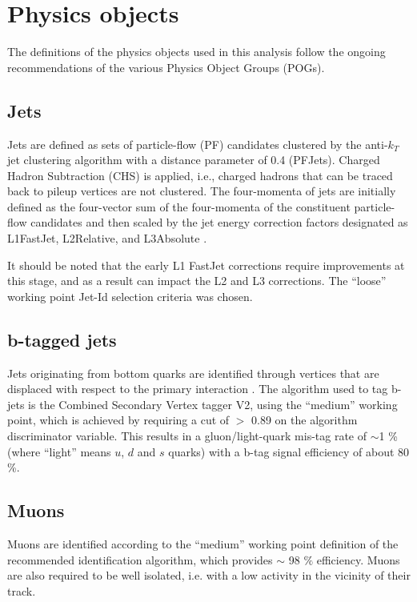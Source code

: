 \section{Physics objects}
\label{sec:objects}
The definitions of the physics objects used in this analysis follow the ongoing recommendations of the various Physics Object Groups (POGs). 

\subsection{Jets}
\label{sec:jetreco}
Jets are defined as sets of particle-flow (PF) candidates clustered by the
anti-$k_{T}$ jet clustering algorithm \cite{Cacciari:2008gp} with a distance parameter of 0.4
(PFJets). Charged Hadron Subtraction (CHS) is applied, i.e., charged
hadrons that can be traced back to pileup vertices are not clustered.
The four-momenta of jets are initially defined as the four-vector sum of
the four-momenta of the constituent particle-flow candidates and then
scaled by the jet energy correction factors designated as L1FastJet,
L2Relative, and L3Absolute \cite{Chatrchyan:2011ds}.

It should be noted that the early L1 FastJet corrections require
improvements at this stage, and as a result can impact the L2 and L3
corrections. The ``loose'' working point Jet-Id selection criteria was
chosen.

\subsection{b-tagged jets}
\label{sec:btags}
Jets originating from bottom quarks are identified through vertices that are displaced with respect to the primary interaction \cite{Chatrchyan:2012jua}. The algorithm used to tag b-jets is the Combined Secondary Vertex tagger V2, using the ``medium'' working point, which is achieved by requiring a cut of $>$ 0.89 on the algorithm discriminator variable. 
This results in a gluon/light-quark mis-tag rate of $\sim$1 \% (where ``light'' means $u$, $d$ and $s$ quarks) with a b-tag signal efficiency of about 80 \%. 


\subsection{Muons}
\label{sec:muon-id}
Muons are identified according to the ``medium'' working point definition of the recommended identification algorithm, which provides $\sim$ 98 $\%$ efficiency. 
Muons are also required to be well isolated, i.e. with a low activity in the vicinity of their track. 


